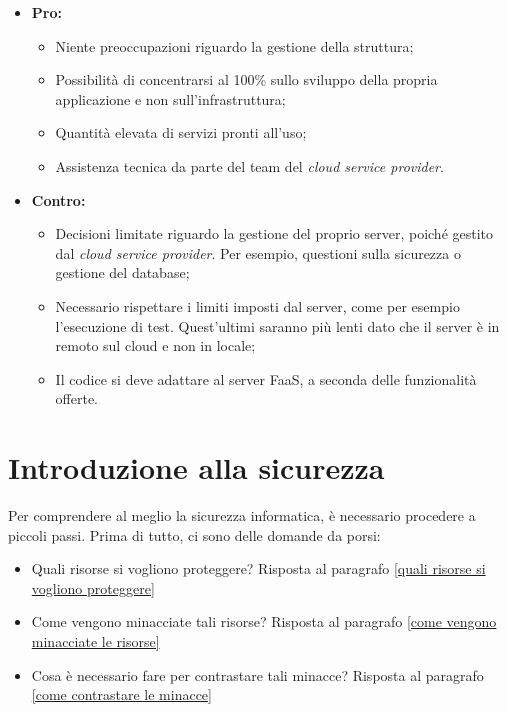 \documentclass[a4paper]{article}
\begin{document}
	\begin{itemize}
		\item \textcolor{Green4}{\textbf{Pro:}}
		\begin{itemize}
			\item Niente preoccupazioni riguardo la gestione della struttura;
		
			\item Possibilità di concentrarsi al 100\% sullo sviluppo della propria applicazione e non sull'infrastruttura;
		
			\item Quantità elevata di servizi pronti all'uso;
		
			\item Assistenza tecnica da parte del team del \emph{cloud service provider}.
		\end{itemize}
		
		\item \textcolor{Red3}{\textbf{Contro:}}
		\begin{itemize}
			\item Decisioni limitate riguardo la gestione del proprio server, poiché gestito dal \emph{cloud service provider}. Per esempio, questioni sulla sicurezza o gestione del database;
			
			\item Necessario rispettare i limiti imposti dal server, come per esempio l'esecuzione di test. Quest'ultimi saranno più lenti dato che il server è in remoto sul cloud e non in locale;
			
			\item Il codice si deve adattare al server FaaS, a seconda delle funzionalità offerte.
		\end{itemize}
	\end{itemize}\newpage
	
	\section{Introduzione alla sicurezza}
	
	Per comprendere al meglio la sicurezza informatica, è necessario procedere a piccoli passi. Prima di tutto, ci sono delle domande da porsi:
	\begin{itemize}
		\item Quali risorse si vogliono proteggere? Risposta al paragrafo \ref{quali risorse si vogliono proteggere}
		\item Come vengono minacciate tali risorse? Risposta al paragrafo \ref{come vengono minacciate le risorse}
		\item Cosa è necessario fare per contrastare tali minacce? Risposta al paragrafo \ref{come contrastare le minacce}
	\end{itemize}
\end{document}
